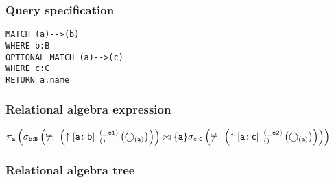 \subsubsection*{Query specification}

\begin{lstlisting}
MATCH (a)-->(b)
WHERE b:B
OPTIONAL MATCH (a)-->(c)
WHERE c:C
RETURN a.name
\end{lstlisting}

\subsubsection*{Relational algebra expression}

$\projection{\var{a}} \left(\selection{\mathtt{b:B}} \left(\alldifferent{} \left(\expandout{a}{b}{}{\_e1}{} \left(\getvertices{a}{}\right)\right)\right) \join \{\var{a}\} \selection{\mathtt{c:C}} \left(\alldifferent{} \left(\expandout{a}{c}{}{\_e2}{} \left(\getvertices{a}{}\right)\right)\right)\right)$

\subsubsection*{Relational algebra tree}



